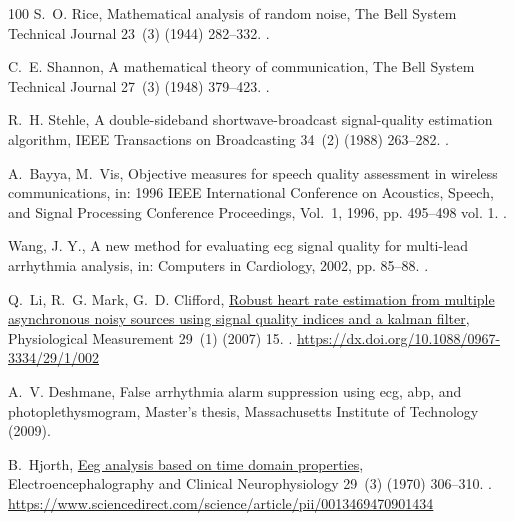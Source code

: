 \documentclass[final,3p,times,twocolumn]{elsarticle}
\begin{document}
\begin{thebibliography}{100}
S.~O. Rice, Mathematical analysis of random noise, The Bell System Technical
  Journal 23~(3) (1944) 282--332.
\newblock \href {https://doi.org/10.1002/j.1538-7305.1944.tb00874.x}
  {}.

C.~E. Shannon, A mathematical theory of communication, The Bell System
  Technical Journal 27~(3) (1948) 379--423.
\newblock \href {https://doi.org/10.1002/j.1538-7305.1948.tb01338.x}
  {}.

R.~H. Stehle, A double-sideband shortwave-broadcast signal-quality estimation
  algorithm, IEEE Transactions on Broadcasting 34~(2) (1988) 263--282.
\newblock \href {https://doi.org/10.1109/11.1443} {}.

A.~Bayya, M.~Vis, Objective measures for speech quality assessment in wireless
  communications, in: 1996 IEEE International Conference on Acoustics, Speech,
  and Signal Processing Conference Proceedings, Vol.~1, 1996, pp. 495--498 vol.
  1.
\newblock \href {https://doi.org/10.1109/ICASSP.1996.541141}
  {}.

{Wang, J. Y.}, A new method for evaluating ecg signal quality for multi-lead
  arrhythmia analysis, in: Computers in Cardiology, 2002, pp. 85--88.
\newblock \href {https://doi.org/10.1109/CIC.2002.1166713}
  {}.

Q.~Li, R.~G. Mark, G.~D. Clifford,
  \href{https://dx.doi.org/10.1088/0967-3334/29/1/002}{Robust heart rate
  estimation from multiple asynchronous noisy sources using signal quality
  indices and a kalman filter}, Physiological Measurement 29~(1) (2007) 15.
\newblock \href {https://doi.org/10.1088/0967-3334/29/1/002}
  {}.
\newline\urlprefix\url{https://dx.doi.org/10.1088/0967-3334/29/1/002}

A.~V. Deshmane, False arrhythmia alarm suppression using ecg, abp, and
  photoplethysmogram, Master's thesis, Massachusetts Institute of Technology
  (2009).

B.~Hjorth,
  \href{https://www.sciencedirect.com/science/article/pii/0013469470901434}{Eeg
  analysis based on time domain properties}, Electroencephalography and
  Clinical Neurophysiology 29~(3) (1970) 306--310.
\newblock \href {https://doi.org/https://doi.org/10.1016/0013-4694(70)90143-4}
  {}.
\newline\urlprefix\url{https://www.sciencedirect.com/science/article/pii/0013469470901434}


\end{thebibliography}
\end{document}
